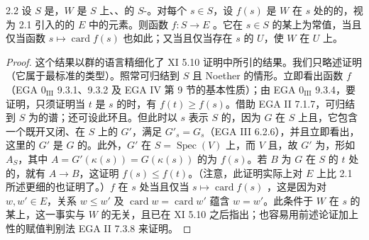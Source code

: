 \begin{SGAresult}{}{2.2}
设 $S$ 是，$W$ 是 $S$ 上、、的 $S$-。对每个 $s\in S$，设 $f(s)$ 是 $W$ 在 $s$ 处的的，视为 2.1 引入的的 $E$ 中的元素。则函数 $f:S\to E$ 。它在 $s\in S$ 的某上为常值，当且仅当函数 $s\mapsto\operatorname{card}f(s)$ 也如此；又当且仅当存在 $s$ 的 $U$，使 $W$ 在 $U$ 上。
\end{SGAresult}
\begin{proof}
这个结果以群的语言精细化了 XI 5.10 证明中所引的结果。我们只略述证明（它属于最标准的类型）。照常可归结到 $S$ 且 Noether 的情形。立即看出函数 $f$ （EGA $0_{\mathrm{III}}$ 9.3.1、9.3.2 及 EGA IV 第 9 节的基本性质）；由 EGA $0_{\mathrm{III}}$ 9.3.4，要证明，只须证明当 $t$ 是 $s$ 的时，有 $f(t)\geq f(s)$。借助 EGA II 7.1.7，可归结到 $S$ 为的谱；还可设此环且。但此时以 $s$ 表示 $S$ 的，因为 $G$ 在 $S$ 上且，它包含一个既开又闭、在 $S$ 上的 $G'$，满足 $G'_s=G_s$（EGA III 6.2.6），并且立即看出，这里的 $G'$ 是 $G$ 的。此外，$G'$ 在 $S=\operatorname{Spec}(V)$ 上，而 $V$ 且，故 $G'$ 为，形如 $A_S$，其中 $A=G'(\kappa(s))=G(\kappa(s))$ 的为 $f(s)$。若 $B$ 为 $G$ 在 $S$ 的 $t$ 处的，就有 $A\to B$，这证明 $f(s)\leq f(t)$。（注意，此证明实际上对 $E$ 上比 2.1 所述更细的也证明了。）$f$ 在 $s$ 处当且仅当 $s\mapsto\operatorname{card}f(s)$ ，这是因为对 $w,w'\in E$，关系 $w\leq w'$ 及 $\operatorname{card}w=\operatorname{card}w'$ 蕴含 $w=w'$。此条件于 $W$ 在 $s$ 的某上，这一事实与 $W$ 的无关，且已在 XI 5.10 之后指出；也容易用前述论证加上性的赋值判别法 EGA II 7.3.8 来证明。
\end{proof}
